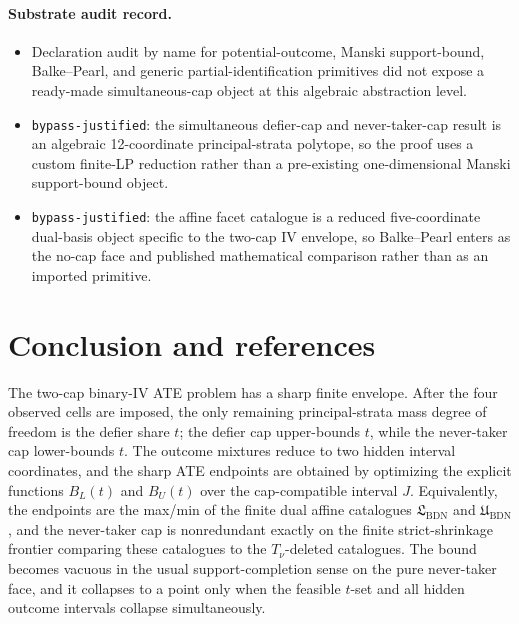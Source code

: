 \documentclass[11pt]{article}
\theoremstyle{definition}
\theoremstyle{plain}
\theoremstyle{remark}
\begin{document}
\paragraph{Substrate audit record.}
\begin{itemize}[leftmargin=*]
\item Declaration audit by name for potential-outcome, Manski support-bound,
Balke--Pearl, and generic partial-identification primitives did not expose a
ready-made simultaneous-cap object at this algebraic abstraction level.
\item \texttt{bypass-justified}: the simultaneous defier-cap and never-taker-cap
result is an algebraic 12-coordinate principal-strata polytope, so the proof
uses a custom finite-LP reduction rather than a pre-existing one-dimensional
Manski support-bound object.
\item \texttt{bypass-justified}: the affine facet catalogue is a reduced
five-coordinate dual-basis object specific to the two-cap IV envelope, so
Balke--Pearl enters as the no-cap face and published mathematical comparison
rather than as an imported primitive.
\end{itemize}

\section{Conclusion and references}
The two-cap binary-IV ATE problem has a sharp finite envelope.  After the four
observed cells are imposed, the only remaining principal-strata mass degree of
freedom is the defier share \(t\); the defier cap upper-bounds \(t\), while the
never-taker cap lower-bounds \(t\).  The outcome mixtures reduce to two hidden
interval coordinates, and the sharp ATE endpoints are obtained by optimizing
the explicit functions \(B_L(t)\) and \(B_U(t)\) over the cap-compatible
interval \(J\).  Equivalently, the endpoints are the max/min of the finite
dual affine catalogues \(\mathfrak{L}_{\mathrm{BDN}}\) and
\(\mathfrak{U}_{\mathrm{BDN}}\), and the never-taker cap is nonredundant
exactly on the finite strict-shrinkage frontier comparing these catalogues to
the \(T_\nu\)-deleted catalogues.  The bound becomes vacuous in the usual
support-completion sense on the pure never-taker face, and it collapses to a
point only when the feasible \(t\)-set and all hidden outcome intervals
collapse simultaneously.
\end{document}
